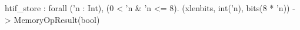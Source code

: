 htif_store : forall ('n : Int), (0 < 'n & 'n <= 8). (xlenbits, int('n), bits(8 * 'n)) -> MemoryOpResult(bool)